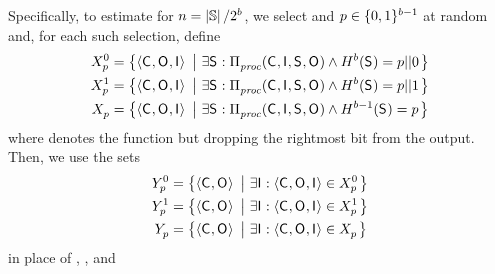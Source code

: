 Specifically, to estimate \Jaccard{\secretsSetSize} for
{$n = \left|{\mathbb{S}}\right|/2^{b}$}, we select
\hashPrefixFn{\hashFnOutputPrefixBits} and $p \in
\{0,1\}^{b-1}$ at random and, for each such
selection, define
\begin{align*}
  X_{p}^{0} & = \left\{\langle\mathsf{C}_{}, \mathsf{O}_{},
  \mathsf{I}_{}\rangle ~\left|~ \exists \mathsf{S}_{} :
  \Pi_{\mathit{proc}}^{}(\mathsf{C}_{}, \mathsf{I}_{}, \mathsf{S}_{}, \mathsf{O}_{}) \wedge
  H^{b}(\mathsf{S}_{}) = {p}||{0}\right.\right\} \\
    X_{p}^{1} & = \left\{\langle\mathsf{C}_{}, \mathsf{O}_{},
  \mathsf{I}_{}\rangle ~\left|~ \exists \mathsf{S}_{} :
  \Pi_{\mathit{proc}}^{}(\mathsf{C}_{}, \mathsf{I}_{}, \mathsf{S}_{}, \mathsf{O}_{}) \wedge
  H^{b}(\mathsf{S}_{}) = {p}||{1}\right.\right\} \\
    X_{p}^{} & = \left\{\langle\mathsf{C}_{}, \mathsf{O}_{},
  \mathsf{I}_{}\rangle ~\left|~ \exists \mathsf{S}_{} :
  \Pi_{\mathit{proc}}^{}(\mathsf{C}_{}, \mathsf{I}_{}, \mathsf{S}_{}, \mathsf{O}_{}) \wedge
  H^{b-1}(\mathsf{S}_{}) = p\right.\right\}
\end{align*}
where  denotes the function
\hashPrefixFn{\hashFnOutputPrefixBits} but dropping the rightmost bit
from the output.  Then, we use the sets
\begin{align*}
  Y_{p}^{0}
  & = \left\{\langle\mathsf{C}_{}, \mathsf{O}_{}\rangle ~\left|~
      \exists \mathsf{I}_{}: \langle\mathsf{C}_{}, \mathsf{O}_{}, \mathsf{I}_{} \rangle \in
      X_{p}^{0}
      \right.\right\}\\
  Y_{p}^{1}
  & = \left\{\langle\mathsf{C}_{}, \mathsf{O}_{}\rangle ~\left|~
      \exists \mathsf{I}_{}: \langle\mathsf{C}_{}, \mathsf{O}_{}, \mathsf{I}_{} \rangle \in
      X_{p}^{1}
      \right.\right\} \\
  Y_{p}^{}
  & = \left\{\langle\mathsf{C}_{}, \mathsf{O}_{}\rangle ~\left|~
      \exists \mathsf{I}_{}: \langle\mathsf{C}_{}, \mathsf{O}_{}, \mathsf{I}_{} \rangle \in
      X_{p}^{}
      \right.\right\}
\end{align*}
in place of \possibleDoubles{\secretsSet{}},
\possibleDoubles{\secretsSetAlt{}}, and
